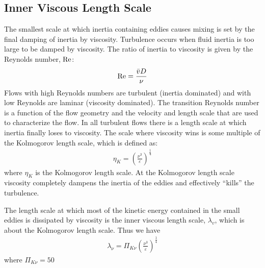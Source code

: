 \documentclass[letterpaper,10pt,english]{sphinxmanual}
\begin{document}
%
\begin{sphinxVerbatim}[commandchars=\\\{\}]
\end{sphinxVerbatim}


\subsection{Inner Viscous Length Scale}
\label{\detokenize{Rapid_Mix/RM_Derivations:inner-viscous-length-scale}}\label{\detokenize{Rapid_Mix/RM_Derivations:heading-inner-viscous-length-scale}}
The smallest scale at which inertia containing eddies causes mixing is set by the final damping of inertia by viscosity. Turbulence occurs when fluid inertia is too large to be damped by viscosity. The ratio of inertia to viscosity is given by the Reynolds number, \(\rm Re\):
\begin{equation}\label{equation:Rapid_Mix/RM_Derivations:Rapid_Mix/RM_Derivations:43}
\begin{split}{\rm{Re}} = \frac{\bar vD}{\nu}\end{split}
\end{equation}
Flows with high Reynolds numbers are turbulent (inertia dominated) and with low Reynolds are laminar (viscosity dominated). The transition Reynolds number is a function of the flow geometry and the velocity and length scale that are used to characterize the flow. In all turbulent flows there is a length scale at which inertia finally loses to viscosity. The scale where viscosity wins is some multiple of the Kolmogorov length scale, which is defined as:
\begin{equation}\label{equation:Rapid_Mix/RM_Derivations:Rapid_Mix/RM_Derivations:44}
\begin{split}\eta_K = \left( \frac{\nu^3}{\varepsilon} \right)^{\frac{1}{4}}\end{split}
\end{equation}
where \(\eta_K\) is the Kolmogorov length scale. At the Kolmogorov length scale viscosity completely dampens the inertia of the eddies and effectively “kills” the turbulence.

The length scale at which most of the kinetic energy contained in the small eddies is dissipated by viscosity is the inner viscous length scale, \(\lambda_v\), which is about  the
Kolmogorov length scale. Thus we have
\begin{equation}\label{equation:Rapid_Mix/RM_Derivations:eq_inner_viscous_length}
\begin{split}\lambda_\nu = \Pi_{K\nu}\left( \frac{\nu^3}{\varepsilon} \right)^{\frac{1}{4}}\end{split}
\end{equation}
where \(\Pi_{K\nu} = 50\)
\end{document}

